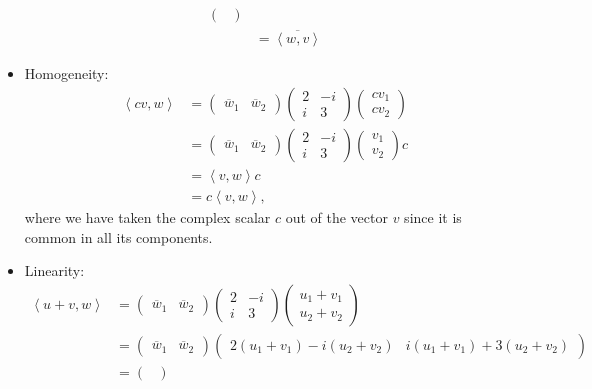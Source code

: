\begin{questions}
\begin{solution}
\begin{itemize}
\begin{align*}
{\begin{pmatrix}
\end{pmatrix}}\\
&=\overline{\left\langle w,v\right\rangle}
\end{align*}
\item Homogeneity:
\begin{align*}
\left<cv,w\right>&=\begin{pmatrix}
\overline{w}_1&\overline{w}_2
\end{pmatrix}\begin{pmatrix}
2&-i\\i&3
\end{pmatrix}\begin{pmatrix}
cv_1\\cv_2
\end{pmatrix}\\
&=\begin{pmatrix}
\overline{w}_1&\overline{w}_2
\end{pmatrix}\begin{pmatrix}
2&-i\\i&3
\end{pmatrix}\begin{pmatrix}
v_1\\v_2
\end{pmatrix}c\\
&=\left<v,w\right>c\\
&=c\left<v,w\right>,
\end{align*}
where we have taken the complex scalar $c$ out of the vector $v$ since it is common in all its components.
\item Linearity: 
\begin{align*}
\left<u+v,w\right>&=\begin{pmatrix}
\overline{w}_1&\overline{w}_2
\end{pmatrix}\begin{pmatrix}
2&-i\\i&3
\end{pmatrix}\begin{pmatrix}
u_1+v_1\\u_2+v_2
\end{pmatrix}\\
&=\begin{pmatrix}
\overline{w}_1&\overline{w}_2
\end{pmatrix}\begin{pmatrix}
2(u_1+v_1)-i(u_2+v_2)&i(u_1+v_1)+3(u_2+v_2)
\end{pmatrix}\\
&=\begin{pmatrix}

\end{pmatrix}
\end{align*}
\end{itemize}
\end{solution}
\end{questions}
